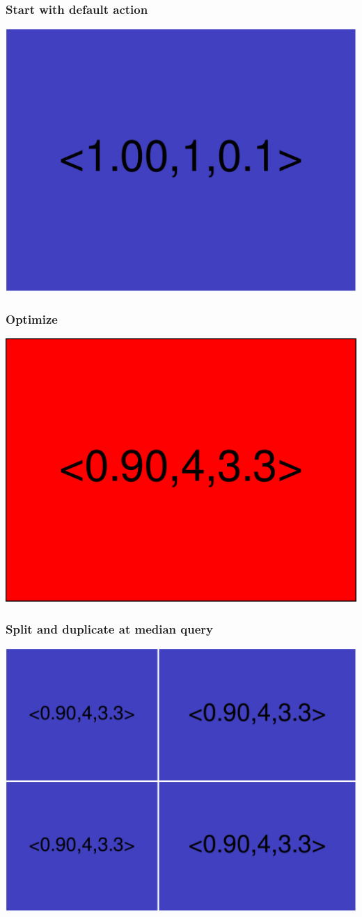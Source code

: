 \begin{frame}
\frametitle{Start with default action}
\begin{centering}
\includegraphics[width=8.5 cm]{remy-graph/graph/test0.pdf}

\end{centering}
\end{frame}

\begin{frame}
\frametitle{Optimize}
\begin{centering}
\includegraphics[width=8.5 cm]{remy-graph/graph/test1.pdf}

\end{centering}
\end{frame}

\begin{frame}
\frametitle{Split and duplicate at median query}
\begin{centering}
\includegraphics[width=8.5 cm]{remy-graph/graph/test2.pdf}

\end{centering}
\end{frame}

